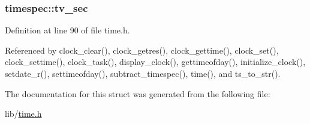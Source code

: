 \subsubsection[{\texorpdfstring{tv\+\_\+sec}{tv_sec}}]{ timespec\+::tv\+\_\+sec}\hypertarget{structtimespec_afc3302668d7cb5952f590da69fdd4955}{}\label{structtimespec_afc3302668d7cb5952f590da69fdd4955}


Definition at line 90 of file time.\+h.



Referenced by clock\+\_\+clear(), clock\+\_\+getres(), clock\+\_\+gettime(), clock\+\_\+set(), clock\+\_\+settime(), clock\+\_\+task(), display\+\_\+clock(), gettimeofday(), initialize\+\_\+clock(), setdate\+\_\+r(), settimeofday(), subtract\+\_\+timespec(), time(), and ts\+\_\+to\+\_\+str().



The documentation for this struct was generated from the following file\+:\begin{DoxyCompactItemize}
\item 
lib/\hyperlink{time_8h}{time.\+h}\end{DoxyCompactItemize}

